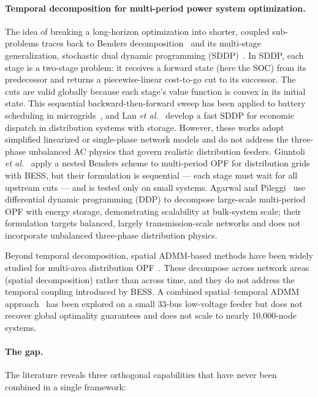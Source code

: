 \paragraph{Temporal decomposition for multi-period power system optimization.}
The idea of breaking a long-horizon optimization into shorter, coupled sub-problems
traces back to Benders decomposition~\cite{Be62} and its multi-stage
generalization, stochastic dual dynamic programming (SDDP)~\cite{PePi91}.
In SDDP, each stage is a two-stage problem: it receives a forward state (here the
SOC) from its predecessor and returns a piecewise-linear cost-to-go cut to its
successor. The cuts are valid globally because each stage's value function is
convex in its initial state. This sequential backward-then-forward sweep has been
applied to battery scheduling in microgrids~\cite{BhKh16}, and Lan
\textit{et al.}~\cite{LaZh22} develop a fast SDDP for economic dispatch in
distribution systems with storage. However, these works adopt simplified
linearized or single-phase network models and do not address the three-phase
unbalanced AC physics that govern realistic distribution feeders. Giuntoli
\textit{et al.}~\cite{GiSu21} apply a nested Benders scheme to multi-period OPF
for distribution grids with BESS, but their formulation is sequential — each
stage must wait for all upstream cuts — and is tested only on small systems.
Agarwal and Pileggi~\cite{AgPi21} use differential dynamic programming (DDP) to
decompose large-scale multi-period OPF with energy storage, demonstrating
scalability at bulk-system scale; their formulation targets balanced, largely
transmission-scale networks and does not incorporate unbalanced three-phase
distribution physics.

Beyond temporal decomposition, spatial ADMM-based methods have been widely
studied for multi-area distribution OPF~\cite{PeLo16,ErPa14}. These decompose
across network areas (spatial decomposition) rather than across time, and
they do not address the temporal coupling introduced by BESS. A combined
spatial–temporal ADMM approach~\cite{PiBe20} has been explored on a small
33-bus low-voltage feeder but does not recover global optimality guarantees and
does not scale to nearly 10,000-node systems.

\paragraph{The gap.}
The literature reveals three orthogonal capabilities that have never been
combined in a single framework:

